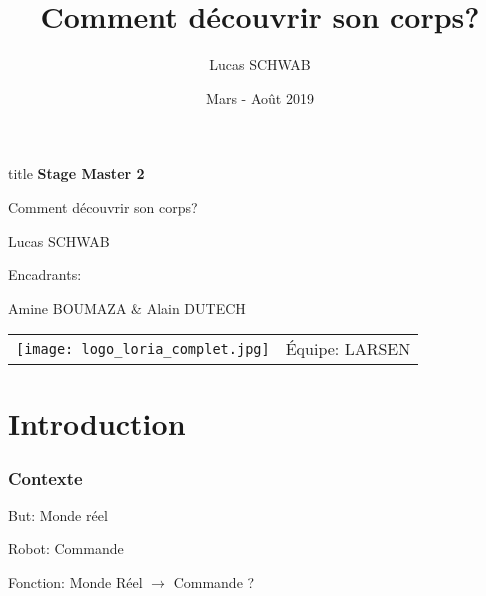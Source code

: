 \documentclass[french]{beamer}
\title{Comment découvrir son corps?}
\author{Lucas SCHWAB}
\date{Mars - Août 2019}
\begin{document}
\begin{frame}
    \begin{center}
        \begin{beamercolorbox}[sep=8pt,center]{title}
            \Huge \textbf{Stage Master 2}

            \huge Comment découvrir son corps?
        \end{beamercolorbox}
        \vfill

        Lucas SCHWAB

        \vfill

        Encadrants:

        Amine BOUMAZA
        \&
        Alain DUTECH

        \vfill

        \begin{tabular}{m{} m{}}
            \texttt{[image: logo\_loria\_complet.jpg]}
            &
            \'Equipe:
            LARSEN
        \end{tabular}
    \end{center}

\end{frame}


\begin{frame}
    \hfill
    \parbox[t]{.88\textwidth}{
        \begin{minipage}[c][0.75\textheight]{0.88\textwidth}
        \tableofcontents
        \end{minipage}
    }
\end{frame}

\section{Introduction}

\begin{frame}
    \frametitle{Contexte}


    But: Monde réel
    
    Robot: Commande

    \phantom{}

    Fonction: Monde Réel $\rightarrow$ Commande ?

    \vfill

\end{frame}
\end{document}
